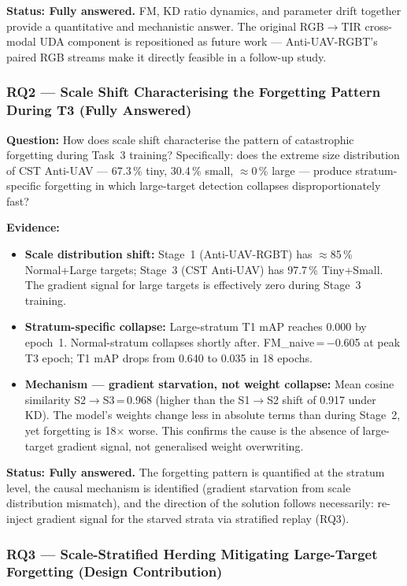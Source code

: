 \noindent \textbf{Status: Fully answered.} FM, KD ratio dynamics, and
parameter drift together provide a quantitative and mechanistic answer.
The original RGB$\to$TIR cross-modal UDA component is repositioned as
future work — Anti-UAV-RGBT's paired RGB streams make it directly
feasible in a follow-up study.

\subsubsection*{RQ2 — Scale Shift Characterising the Forgetting Pattern During T3 (Fully Answered)}

\textbf{Question:} How does scale shift characterise the pattern of
catastrophic forgetting during Task~3 training? Specifically: does the
extreme size distribution of CST Anti-UAV — 67.3\,\% tiny, 30.4\,\%
small, $\approx$0\,\% large — produce stratum-specific forgetting in
which large-target detection collapses disproportionately fast?

\textbf{Evidence:}
\begin{itemize}
    \item \textbf{Scale distribution shift:} Stage~1 (Anti-UAV-RGBT)
    has $\approx$85\,\% Normal+Large targets; Stage~3 (CST Anti-UAV)
    has 97.7\,\% Tiny+Small. The gradient signal for large targets
    is effectively zero during Stage~3 training.
    \item \textbf{Stratum-specific collapse:} Large-stratum T1 mAP
    reaches 0.000 by epoch~1. Normal-stratum collapses shortly after.
    FM\_naive\,=\,$-$0.605 at peak T3 epoch; T1 mAP drops from 0.640
    to 0.035 in 18 epochs.
    \item \textbf{Mechanism — gradient starvation, not weight collapse:}
    Mean cosine similarity S2$\to$S3\,=\,0.968 (higher than the
    S1$\to$S2 shift of 0.917 under KD). The model's weights change less
    in absolute terms than during Stage~2, yet forgetting is 18$\times$
    worse. This confirms the cause is the absence of large-target
    gradient signal, not generalised weight overwriting.
\end{itemize}

\noindent \textbf{Status: Fully answered.} The forgetting pattern is
quantified at the stratum level, the causal mechanism is identified
(gradient starvation from scale distribution mismatch), and the
direction of the solution follows necessarily: re-inject gradient
signal for the starved strata via stratified replay (RQ3).

\subsubsection*{RQ3 — Scale-Stratified Herding Mitigating Large-Target Forgetting (Design Contribution)}

